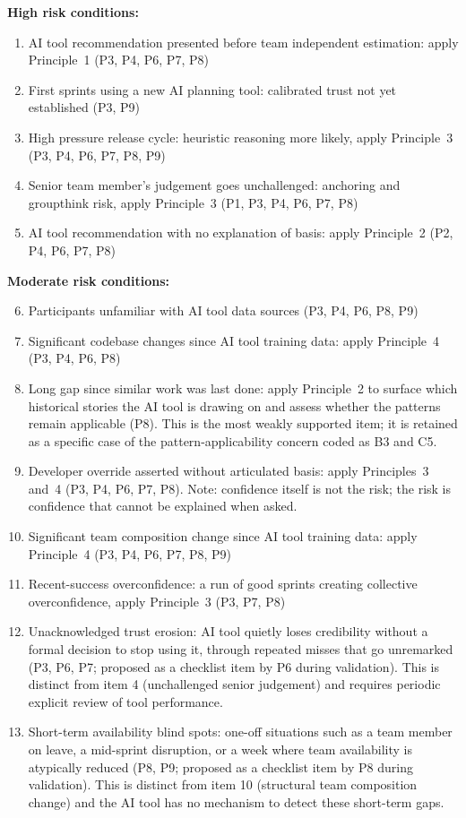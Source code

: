 \documentclass[a4paper,twoside]{bth}
\begin{document}
\textbf{High risk conditions:}
\begin{enumerate}
  \item AI tool recommendation presented before team independent estimation: apply Principle~1 (P3, P4, P6, P7, P8)
  \item First sprints using a new AI planning tool: calibrated trust not yet established (P3, P9)
  \item High pressure release cycle: heuristic reasoning more likely, apply Principle~3 (P3, P4, P6, P7, P8, P9)
  \item Senior team member's judgement goes unchallenged: anchoring and groupthink risk, apply Principle~3 (P1, P3, P4, P6, P7, P8)
  \item AI tool recommendation with no explanation of basis: apply Principle~2 (P2, P4, P6, P7, P8)
\end{enumerate}

\textbf{Moderate risk conditions:}
\begin{enumerate}
  \setcounter{enumi}{5}
  \item Participants unfamiliar with AI tool data sources (P3, P4, P6, P8, P9)
  \item Significant codebase changes since AI tool training data: apply Principle~4 (P3, P4, P6, P8)
  \item Long gap since similar work was last done: apply Principle~2 to surface which historical stories the AI tool is drawing on and assess whether the patterns remain applicable (P8). This is the most weakly supported item; it is retained as a specific case of the pattern-applicability concern coded as B3 and C5.
  \item Developer override asserted without articulated basis: apply Principles~3 and~4 (P3, P4, P6, P7, P8). Note: confidence itself is not the risk; the risk is confidence that cannot be explained when asked.
  \item Significant team composition change since AI tool training data: apply Principle~4 (P3, P4, P6, P7, P8, P9)
  \item Recent-success overconfidence: a run of good sprints creating collective overconfidence, apply Principle~3 (P3, P7, P8)
  \item Unacknowledged trust erosion: AI tool quietly loses credibility without a formal decision to stop using it, through repeated misses that go unremarked (P3, P6, P7; proposed as a checklist item by P6 during validation). This is distinct from item 4 (unchallenged senior judgement) and requires periodic explicit review of tool performance.
  \item Short-term availability blind spots: one-off situations such as a team member on leave, a mid-sprint disruption, or a week where team availability is atypically reduced (P8, P9; proposed as a checklist item by P8 during validation). This is distinct from item 10 (structural team composition change) and the AI tool has no mechanism to detect these short-term gaps.
\end{enumerate}
\end{document}
